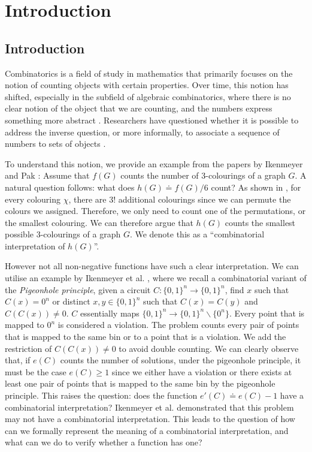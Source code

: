
\chapter{Introduction}
\section{Introduction}
\label{sec:Introduction}


Combinatorics is a field of study in mathematics that primarily focuses on
the notion of counting objects with certain properties. Over time, this notion
has shifted, especially in the subfield of algebraic combinatorics, where
there is no clear notion of the object that we are counting,
and the numbers express something more abstract \cite{pak_WhatCombinatorialInterpretation_2022}.
Researchers have questioned whether it is possible to address the inverse question,
or more informally, to associate a sequence of numbers to sets of objects
\cite{ikenmeyer_WhatWhatNot_2022,pak_WhatCombinatorialInterpretation_2022,ikenmeyer_PositivitySymmetricGroup_2024}.


To understand this notion, we provide an example from the papers by Ikenmeyer and Pak \cite{pak_WhatCombinatorialInterpretation_2022,ikenmeyer_WhatWhatNot_2022}:
Assume that $f(G)$ counts the number of 3-colourings of a graph $G$. A natural question follows: what does 
$h(G) \doteq f(G)/ 6$ count?
As shown in \cite{pak_WhatCombinatorialInterpretation_2022,ikenmeyer_WhatWhatNot_2022},
for every colouring $\chi$, there are $3!$ additional colourings since
we can permute the colours we assigned. Therefore, we only need to count
one of the permutations, or the smallest colouring. We can therefore argue that $h(G)$ 
counts the smallest possible 3-colourings of a graph $G$.
We denote this as a ``combinatorial interpretation of $h(G)$''.

However not all non-negative functions have such a clear interpretation.
We can utilise an example by Ikenmeyer et al. \cite{ikenmeyer_WhatWhatNot_2022},
where we recall a combinatorial variant of the \textit{Pigeonhole principle},
given a circuit $C:\{0,1\}^n \to \{0,1\}^n$, find $x$ such that $C(x) = 0^n$
or distinct $x,y \in \{0,1\}^n$ such that $C(x)=C(y)$ and $C(C(x)) \neq 0$.
$C$ essentially maps
$\{0,1\}^n \to \{0,1\}^n \smallsetminus \{0^n\}$.
Every point that is mapped to $0^n$ is considered a violation.
The problem counts every pair of points that is mapped to the same bin
or to a point that is a violation. We add the restriction
of $C(C(x)) \neq 0$ to avoid double counting. We can clearly observe that, if $e(C)$
counts the number of solutions, under the pigeonhole principle, it must be the case $e(C) \geq 1$ since we either have a violation
or there exists at least one pair of points that is mapped to the same bin by the pigeonhole principle.
This raises the question: does the function $e'(C) \doteq e(C) -1$
have a combinatorial interpretation?
Ikenmeyer et al. \cite{ikenmeyer_WhatWhatNot_2022} demonstrated that
this problem may not have a combinatorial interpretation.
This leads to the question of how can we formally represent the meaning
of a combinatorial interpretation, and what can we do to verify whether
a function has one?

